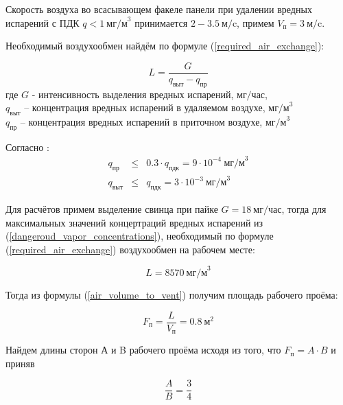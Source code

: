 Скорость воздуха во всасывающем факеле панели при удалении вредных испарений с
ПДК $q < 1 ~\text{мг/м}^3$ \cite[табл. 1.1]{local_vent_spot_calc_method} принимается
$2 - 3.5 ~\text{м/c}$, примем $V_\text{п} = 3 ~\text{м/c}$.

Необходимый воздухообмен найдём по формуле (\ref{required_air_exchange}):

\begin{equation}
\label{required_air_exchange}
    L = \frac{G}{q_\text{выт} - q_\text{пр}}
\end{equation}
где $G$ - интенсивность выделения вредных испарений, $\text{мг/час}$,                   \\
$q_\text{выт}$ – концентрация вредных испарений в удаляемом воздухе, $\text{мг/м}^3$    \\
$q_\text{пр}$ – концентрация вредных испарений в приточном воздухе, $\text{мг/м}^3$

Согласно \cite[п. 2.15]{ecology_san_norm_245_71}:
\begin{equation}
\label{dangeroud_vapor_concentrations}
    \begin{array}{lcr}
        q_\text{пр}  & \leq & 0.3 \cdot q_\text{пдк} = 9 \cdot 10^{-4} ~\text{мг/м}^3 \\
        q_\text{выт} & \leq &           q_\text{пдк} = 3 \cdot 10^{-3} ~\text{мг/м}^3
    \end{array}
\end{equation}

Для расчётов примем выделение свинца при пайке $G = 18 ~\text{мг/час}$,
тогда для максимальных значений концертраций вредных испарений из
(\ref{dangeroud_vapor_concentrations}), необходимый по формуле (\ref{required_air_exchange})
воздухообмен на рабочем месте:

$$
    L = 8570 ~\text{мг/м}^3
$$

Тогда из формулы (\ref{air_volume_to_vent}) получим площадь рабочего проёма:

\begin{equation}
\label{working_window_area}
    F_\text{п} = \frac{L}{V_\text{п}} = 0.8 ~\text{м}^2
\end{equation}

Найдем длины сторон А и B рабочего проёма исходя из того, что $F_\text{п}  = A \cdot B$ и приняв

\begin{equation}
\label{working_window_area_sides_ratio}
    \frac{A}{B} = \frac{3}{4}
\end{equation}

